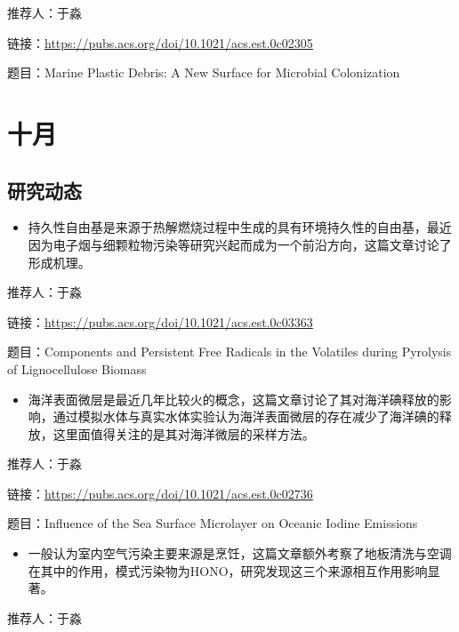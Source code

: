 \documentclass[
]{book}
\providecommand{\tightlist}{%
  \setlength{\itemsep}{0pt}\setlength{\parskip}{0pt}}
\begin{document}
推荐人：于淼

链接：\url{https://pubs.acs.org/doi/10.1021/acs.est.0c02305}

题目：Marine Plastic Debris: A New Surface for Microbial Colonization

\hypertarget{ux5341ux6708-2}{%
\section*{十月}\label{ux5341ux6708-2}}

\hypertarget{ux7814ux7a76ux52a8ux6001-35}{%
\subsection*{研究动态}\label{ux7814ux7a76ux52a8ux6001-35}}

\begin{itemize}
\tightlist
\item
  持久性自由基是来源于热解燃烧过程中生成的具有环境持久性的自由基，最近因为电子烟与细颗粒物污染等研究兴起而成为一个前沿方向，这篇文章讨论了形成机理。
\end{itemize}

推荐人：于淼

链接：\url{https://pubs.acs.org/doi/10.1021/acs.est.0c03363}

题目：Components and Persistent Free Radicals in the Volatiles during Pyrolysis of Lignocellulose Biomass

\begin{itemize}
\tightlist
\item
  海洋表面微层是最近几年比较火的概念，这篇文章讨论了其对海洋碘释放的影响，通过模拟水体与真实水体实验认为海洋表面微层的存在减少了海洋碘的释放，这里面值得关注的是其对海洋微层的采样方法。
\end{itemize}

推荐人：于淼

链接：\url{https://pubs.acs.org/doi/10.1021/acs.est.0c02736}

题目：Influence of the Sea Surface Microlayer on Oceanic Iodine Emissions

\begin{itemize}
\tightlist
\item
  一般认为室内空气污染主要来源是烹饪，这篇文章额外考察了地板清洗与空调在其中的作用，模式污染物为HONO，研究发现这三个来源相互作用影响显著。
\end{itemize}

推荐人：于淼
\end{document}
